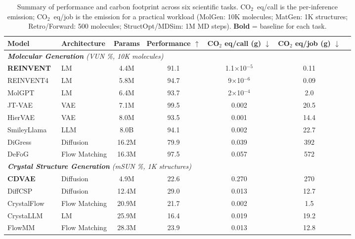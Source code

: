 \documentclass{article}
\theoremstyle{plain}
\theoremstyle{definition}
\theoremstyle{remark}
\begin{document}
\begin{table}[t]
\centering
\caption{Summary of performance and carbon footprint across six scientific tasks. CO$_2$~eq/call is the per-inference emission; CO$_2$~eq/job is the emission for a practical workload (MolGen: 10K molecules; MatGen: 1K structures; Retro/Forward: 500 molecules; StructOpt/MDSim: 1M MD steps). \textbf{Bold} = baseline for each task.}
\label{tab:main_results}
\small
\begin{tabular}{llccccc}
\toprule
\textbf{Model} & Architecture & Params & Performance $\uparrow$ & \makecell{CO$_2$ eq/call\\(g)} $\downarrow$ & \makecell{CO$_2$ eq/job\\(g)} $\downarrow$ \\
\midrule
\multicolumn{6}{l}{\textit{\textbf{Molecular Generation} (VUN \%, 10K molecules)}} \\
\textbf{REINVENT}~\cite{olivecrona2017molecular} & LM & 4.4M & 91.1 & 1.1$\times$10$^{-5}$ & 0.11 \\
REINVENT4~\cite{loeffler2024reinvent} & LM & 5.8M & 94.7 & 9$\times$10$^{-6}$ & 0.09 \\
MolGPT~\cite{bagal2021molgpt} & LM & 6.4M & 93.7 & 2$\times$10$^{-4}$ & 2.0 \\
JT-VAE~\cite{jin2018junction} & VAE & 7.1M & 99.5 & 0.002 & 20.5 \\
HierVAE~\cite{jin2020hierarchical} & VAE & 8.0M & 93.5 & 0.001 & 14.4 \\
SmileyLlama~\cite{cavanagh2024smileyllama} & LLM & 8.0B & 94.1 & 0.002 & 22.7 \\
DiGress~\cite{vignac2022digress} & Diffusion & 16.2M & 79.9 & 0.039 & 392 \\
DeFoG~\cite{dunn2024mixed} & Flow Matching & 16.3M & 97.5 & 0.057 & 572 \\
\midrule
\multicolumn{6}{l}{\textit{\textbf{Crystal Structure Generation} (mSUN \%, 1K structures)}} \\
\textbf{CDVAE}~\cite{xie2021crystal} & Diffusion & 4.9M & 22.6 & 0.270 & 270 \\
DiffCSP~\cite{jiao2023crystal} & Diffusion & 12.4M & 29.0 & 0.013 & 12.7 \\
CrystalFlow~\cite{crystallflow2025icml} & Flow Matching & 20.9M & 21.7 & 0.002 & 1.5 \\
CrystaLLM~\cite{antunes2024crystal} & LM & 25.9M & 16.4 & 0.019 & 19.2 \\
FlowMM~\cite{miller2024flowmm} & Flow Matching & 28.3M & 23.9 & 0.013 & 12.8 \\

\end{tabular}
\end{table}
\end{document}
